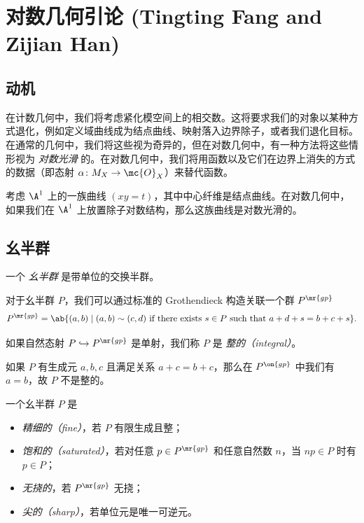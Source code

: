\section{对数几何引论 (Tingting Fang and Zijian Han)}%
\label{sec:Intro to log geometry (Tingting Fang and Zijian Han)}

\subsection{动机}%
\label{sub:Motivation}

在计数几何中，我们将考虑紧化模空间上的相交数。这将要求我们的对象以某种方式退化，例如定义域曲线成为结点曲线、映射落入边界除子，或者我们退化目标。在通常的几何中，我们将这些视为奇异的，但在对数几何中，有一种方法将这些情形视为 \textit{对数光滑} 的。在对数几何中，我们将用函数以及它们在边界上消失的方式的数据（即态射 \(\alpha \colon M_X \to \mc{O}_X\)）来替代函数。

\begin{exm}
    考虑 \(\A^1\) 上的一族曲线 \((xy=t)\)，其中中心纤维是结点曲线。在对数几何中，如果我们在 \(\A^1\) 上放置除子对数结构，那么这族曲线是对数光滑的。
\end{exm}

\subsection{幺半群}%
\label{sub:Monoids}

\begin{defn}
    一个 \textit{幺半群} 是带单位的交换半群。
\end{defn}

对于幺半群 \(P\)，我们可以通过标准的 Grothendieck 构造关联一个群 \(P^{\mr{gp}}\)
\[ P^{\mr{gp}} = \ab\{(a,b) \mid (a,b) \sim (c,d) \text{ if there exists } s \in P \text{ such that } a+d+s = b+c+s \}. \]
\begin{defn}
如果自然态射 \(P \hookrightarrow P^{\mr{gp}}\) 是单射，我们称 \(P\) 是 \textit{整的（integral）}。
\end{defn}

\begin{exm}
    如果 \(P\) 有生成元 \(a,b,c\) 且满足关系 \(a+c=b+c\)，那么在 \(P^{\on{gp}}\) 中我们有 \(a = b\)，故 \(P\) 不是整的。
\end{exm}

\begin{defn}
    一个幺半群 \(P\) 是
    \begin{itemize}
        \item \textit{精细的（fine）}，若 \(P\) 有限生成且整；
        \item \textit{饱和的（saturated）}，若对任意 \(p \in P^{\mr{gp}}\) 和任意自然数 \(n\)，当 \(np \in P\) 时有 \(p \in P\)；
        \item \textit{无挠的}，若 \(P^{\mr{gp}}\) 无挠；
        \item \textit{尖的（sharp）}，若单位元是唯一可逆元。
    \end{itemize}
\end{defn}

